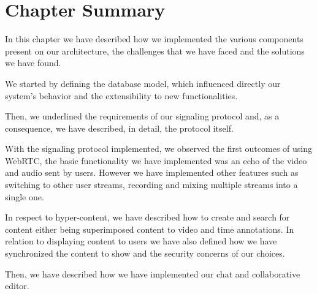 \section{Chapter Summary}
\label{implementation:summary}

In this chapter we have described how we implemented the various components present on our architecture, the challenges that we have faced and the solutions we have found.

We started by defining the database model, which influenced directly our system's behavior and the extensibility to new functionalities.

Then, we underlined the requirements of our signaling protocol and, as a consequence, we have described, in detail, the protocol itself.

With the signaling protocol implemented, we observed the first outcomes of using \ac{WebRTC}, the basic functionality we have implemented was an echo of the video and audio sent by users. However we have implemented other features such as switching to other user streams, recording and mixing multiple streams into a single one.

In respect to hyper-content, we have described how to create and search for content either being superimposed content to video and time annotations. In relation to displaying content to users we have also defined how we have synchronized the content to show and the security concerns of our choices.

Then, we have described how we have implemented our chat and collaborative editor.

